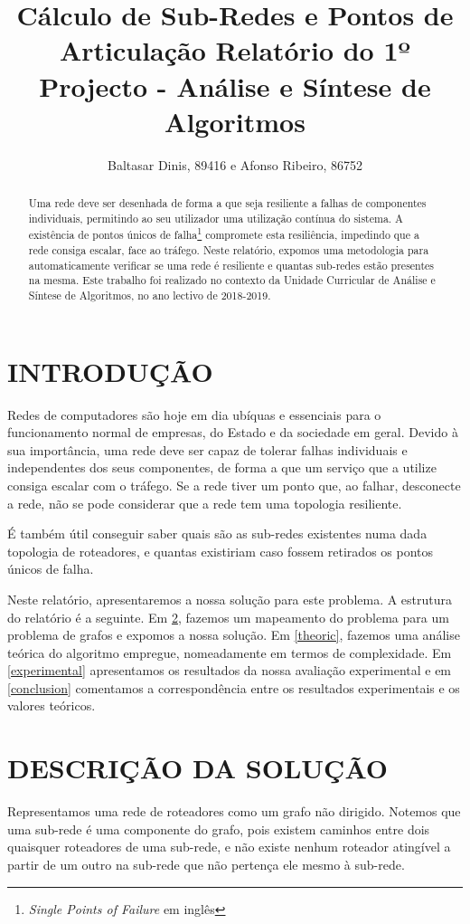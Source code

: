 \documentclass[a4paper, 12pt, conference, portuguese]{ieeeconf}
\title{{\LARGE \bf Cálculo de Sub-Redes e Pontos de Articulação}
\large{Relatório do 1º Projecto - Análise e Síntese de Algoritmos} }
\author{Baltasar Dinis, 89416 e Afonso Ribeiro, 86752}
\begin{document}
\maketitle
\thispagestyle{empty}
\pagestyle{empty}

\begin{abstract}
  Uma rede deve ser desenhada de forma a que seja resiliente a falhas de
  componentes individuais, permitindo ao seu utilizador uma utilização contínua
  do sistema. A existência de pontos únicos de falha\footnote{\textit{Single
  Points of Failure} em inglês} compromete esta resiliência, impedindo que a
  rede consiga escalar, face ao tráfego. Neste relatório, expomos uma
  metodologia para automaticamente verificar se uma rede é resiliente e quantas
  sub-redes estão presentes na mesma. Este trabalho foi realizado no contexto da
  Unidade Curricular de Análise e Síntese de Algoritmos, no ano lectivo de
  2018-2019.
\end{abstract}



\section{INTRODUÇÃO}\label{intro}
Redes de computadores são hoje em dia ubíquas e essenciais para o funcionamento
normal de empresas, do Estado e da sociedade em geral. Devido à sua importância,
uma rede deve ser capaz de tolerar falhas individuais e independentes dos seus
componentes, de forma a que um serviço que a utilize consiga escalar com o
tráfego. Se a rede tiver um ponto que, ao falhar, desconecte a rede, não se pode considerar que a rede tem uma topologia
resiliente.

É também útil conseguir saber quais são as sub-redes existentes numa dada
topologia de roteadores, e quantas existiriam caso fossem retirados os pontos
únicos de falha.

Neste relatório, apresentaremos a nossa solução para este problema. A estrutura
do relatório é a seguinte. Em \ref{sol},
fazemos um mapeamento do problema para um problema de grafos e
expomos a nossa solução. Em \ref{theoric}, fazemos uma análise teórica do
algoritmo empregue, nomeadamente em termos de complexidade. Em
\ref{experimental} apresentamos os resultados da nossa avaliação experimental e
em \ref{conclusion} comentamos a correspondência entre os resultados
experimentais e os valores teóricos.

\section{DESCRIÇÃO DA SOLUÇÃO}\label{sol}
Representamos uma rede de roteadores como um grafo não dirigido. Notemos que uma
sub-rede é uma componente do grafo, pois existem caminhos entre dois quaisquer
roteadores de uma sub-rede, e não existe nenhum roteador atingível a partir de
um outro na sub-rede que não pertença ele mesmo à sub-rede.
\end{document}
